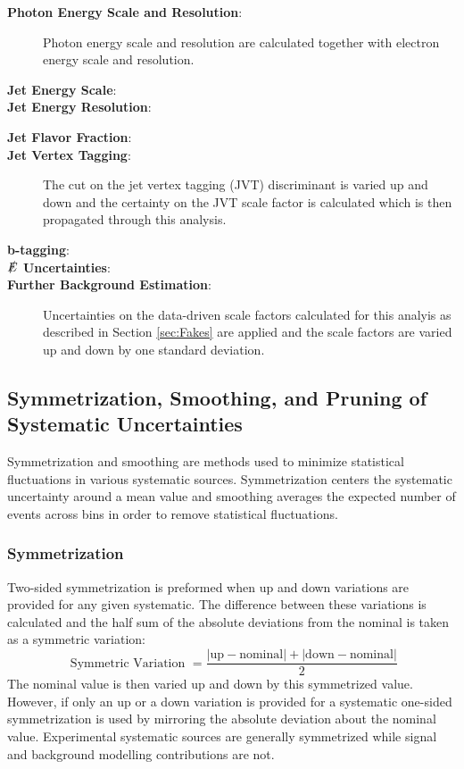 \begin{description}
\item[\textbf{Photon Energy Scale and Resolution}:]  Photon energy scale and resolution are calculated together with electron energy scale and resolution.

\item[\textbf{Jet Energy Scale}:]

\item[\textbf{Jet Energy Resolution}:] \cite{ATL-PHYS-PUB-2015-015}

\item[\textbf{Jet Flavor Fraction}:]  

\item[\textbf{Jet Vertex Tagging}:]  The cut on the jet vertex tagging (JVT) discriminant is varied up and down \cite{JetJVT} and the certainty on the JVT scale factor is calculated which is then propagated through this analysis.

\item[\textbf{b-tagging}:]  

\item[\textbf{$\slashed{E}$ Uncertainties}:] 

\item[\textbf{Further Background Estimation}:] Uncertainties on the data-driven scale factors calculated for this analyis as described in Section \ref{sec:Fakes} are applied and the scale factors are varied up and down by one standard deviation.

\end{description}

\subsection{Symmetrization, Smoothing, and Pruning of Systematic Uncertainties}

Symmetrization and smoothing are methods used to minimize statistical fluctuations in various systematic sources.  Symmetrization centers the systematic uncertainty around a mean value and smoothing averages the expected number of events across bins in order to remove statistical fluctuations.

\subsubsection{Symmetrization}
Two-sided symmetrization is preformed when up and down variations are provided for any given systematic.  The difference between these variations is calculated and the half sum of the absolute deviations from the nominal is taken as a symmetric variation:
\[ \text{ Symmetric Variation } = \frac{|\text{up} - \text{nominal}| +|\text{down}-\text{nominal}|}{2}  \]
The nominal value is then varied up and down by this symmetrized value.  However, if only an up or a down variation is provided for a systematic one-sided symmetrization is used by mirroring the absolute deviation about the nominal value.  Experimental systematic sources are generally symmetrized while signal and background modelling contributions are not.

